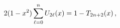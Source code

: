 \[2(1-x^{2})\sum_{\ell=0}^{n}\mathop{U_{2\ell}\/}\nolimits\!\left(x\right)=1-%
\mathop{T_{2n+2}\/}\nolimits\!\left(x\right),\]